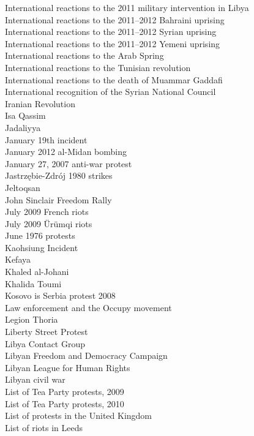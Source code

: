 International reactions to the 2011 military intervention in Libya\\
International reactions to the 2011–2012 Bahraini uprising\\
International reactions to the 2011–2012 Syrian uprising\\
International reactions to the 2011–2012 Yemeni uprising\\
International reactions to the Arab Spring\\
International reactions to the Tunisian revolution\\
International reactions to the death of Muammar Gaddafi\\
International recognition of the Syrian National Council\\
Iranian Revolution\\
Isa Qassim\\
Jadaliyya\\
January 19th incident\\
January 2012 al-Midan bombing\\
January 27, 2007 anti-war protest\\
Jastrzębie-Zdrój 1980 strikes\\
Jeltoqsan\\
John Sinclair Freedom Rally\\
July 2009 French riots\\
July 2009 Ürümqi riots\\
June 1976 protests\\
Kaohsiung Incident\\
Kefaya\\
Khaled al-Johani\\
Khalida Toumi\\
Kosovo is Serbia protest 2008\\
Law enforcement and the Occupy movement\\
Legion Thoria\\
Liberty Street Protest\\
Libya Contact Group\\
Libyan Freedom and Democracy Campaign\\
Libyan League for Human Rights\\
Libyan civil war\\
List of Tea Party protests, 2009\\
List of Tea Party protests, 2010\\
List of protests in the United Kingdom\\
List of riots in Leeds\\
